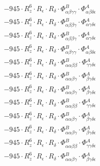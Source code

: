 \documentclass{article}
\begin{document}
\begin{subequations}
\begin{gather}
\begin{array}{c}
 \\[0.2em] 		 - 945 \cdot R_{z}^{6} \cdot R_{\epsilon{}} \cdot R_{\delta{}} \cdot \Phi{}^{B}_{\alpha{}\beta{}\gamma{}\gamma{}} \cdot \Phi{}^{A}_{\alpha{}\beta{}\delta{}\epsilon{}} 
 \\[0.2em] 		 - 945 \cdot R_{z}^{6} \cdot R_{\epsilon{}} \cdot R_{\delta{}} \cdot \Phi{}^{B}_{\alpha{}\beta{}\beta{}\gamma{}} \cdot \Phi{}^{A}_{\alpha{}\gamma{}\delta{}\epsilon{}} 
 \\[0.2em] 		 - 945 \cdot R_{z}^{6} \cdot R_{\epsilon{}} \cdot R_{\delta{}} \cdot \Phi{}^{B}_{\alpha{}\beta{}\beta{}\gamma{}} \cdot \Phi{}^{A}_{\alpha{}\gamma{}\delta{}\epsilon{}} 
 \\[0.2em] 		 - 945 \cdot R_{z}^{6} \cdot R_{\epsilon{}} \cdot R_{\delta{}} \cdot \Phi{}^{B}_{\alpha{}\beta{}\gamma{}\gamma{}} \cdot \Phi{}^{A}_{\alpha{}\beta{}\delta{}\epsilon{}} 
 \\[0.2em] 		 - 945 \cdot R_{z}^{6} \cdot R_{\epsilon{}} \cdot R_{\delta{}} \cdot \Phi{}^{B}_{\alpha{}\alpha{}\beta{}\beta{}} \cdot \Phi{}^{A}_{\gamma{}\gamma{}\delta{}\epsilon{}} 
 \\[0.2em] 		 - 945 \cdot R_{z}^{6} \cdot R_{\epsilon{}} \cdot R_{\delta{}} \cdot \Phi{}^{B}_{\alpha{}\alpha{}\beta{}\gamma{}} \cdot \Phi{}^{A}_{\beta{}\gamma{}\delta{}\epsilon{}} 
 \\[0.2em] 		 - 945 \cdot R_{z}^{6} \cdot R_{\epsilon{}} \cdot R_{\delta{}} \cdot \Phi{}^{B}_{\alpha{}\alpha{}\beta{}\gamma{}} \cdot \Phi{}^{A}_{\beta{}\gamma{}\delta{}\epsilon{}} 
 \\[0.2em] 		 - 945 \cdot R_{z}^{6} \cdot R_{\epsilon{}} \cdot R_{\delta{}} \cdot \Phi{}^{B}_{\alpha{}\alpha{}\beta{}\beta{}} \cdot \Phi{}^{A}_{\gamma{}\gamma{}\delta{}\epsilon{}} 
 \\[0.2em] 		 - 945 \cdot R_{z}^{6} \cdot R_{\epsilon{}} \cdot R_{\delta{}} \cdot \Phi{}^{B}_{\alpha{}\alpha{}\beta{}\gamma{}} \cdot \Phi{}^{A}_{\beta{}\gamma{}\delta{}\epsilon{}} 
 \\[0.2em] 		 - 945 \cdot R_{z}^{6} \cdot R_{\epsilon{}} \cdot R_{\delta{}} \cdot \Phi{}^{B}_{\alpha{}\alpha{}\beta{}\gamma{}} \cdot \Phi{}^{A}_{\beta{}\gamma{}\delta{}\epsilon{}} 
 \\[0.2em] 		 - 945 \cdot R_{z}^{6} \cdot R_{\epsilon{}} \cdot R_{\delta{}} \cdot \Phi{}^{B}_{\alpha{}\alpha{}\beta{}\beta{}} \cdot \Phi{}^{A}_{\gamma{}\gamma{}\delta{}\epsilon{}} 
 \\[0.2em] 		 - 945 \cdot R_{z}^{6} \cdot R_{\epsilon{}} \cdot R_{\delta{}} \cdot \Phi{}^{B}_{\alpha{}\alpha{}\beta{}\gamma{}} \cdot \Phi{}^{A}_{\beta{}\gamma{}\delta{}\epsilon{}} 

\end{array}
\end{gather}
\end{subequations}
\end{document}
